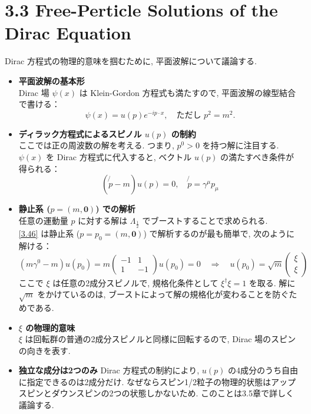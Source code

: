 \documentclass[a4paper,12pt]{article}
\begin{document}
\section*{3.3 Free-Perticle Solutions of the Dirac Equation}
 Dirac 方程式の物理的意味を掴むために, 平面波解について議論する.
\begin{itemize}
  \item \textbf{平面波解の基本形}\\
  Dirac 場 $\psi(x)$ は Klein-Gordon 方程式も満たすので, 平面波解の線型結合で書ける：
  \begin{equation*}
    \psi(x) = u(p) e^{-ip \cdot x}, \quad \text{ただし } p^2 = m^2. \tag{3.45}
  \end{equation*}
  \item \textbf{ディラック方程式によるスピノル $u(p)$ の制約}\\ 
  ここでは正の周波数の解を考える. つまり, $p^0 > 0$ を持つ解に注目する. $\psi(x)$ を Dirac 方程式に代入すると, ベクトル $u(p)$ の満たすべき条件が得られる：
  \begin{equation*}
    (\not{p} - m) u(p) = 0, \quad \not{p} = \gamma^\mu p_\mu \label{3.46}\tag{3.46}
  \end{equation*}

  \item \textbf{静止系 ($p = (m, \mathbf{0})$) での解析}\\
  任意の運動量 $p$ に対する解は $\Lambda_{\frac{1}{2}}$ でブーストすることで求められる.\\
  \eqref{3.46} は静止系 ($p = p_0 = (m, \mathbf{0}) $) で解析するのが最も簡単で, 次のように解ける：
  \begin{equation*}
    (m \gamma^0 - m) u(p_0) = m \begin{pmatrix}
      -1 & 1 \\
      1 & -1
    \end{pmatrix} u(p_0) = 0 \quad \Rightarrow \quad
    u(p_0) = \sqrt{m}
    \begin{pmatrix}
    \xi \\
    \xi
    \end{pmatrix} \tag{3.47}
  \end{equation*}
  ここで $\xi$ は任意の2成分スピノルで, 規格化条件として $\xi^\dagger \xi = 1$ を取る. 解に $\sqrt{m}$ をかけているのは, ブーストによって解の規格化が変わることを防ぐためである.
  \item \textbf{$\xi$ の物理的意味}\\
  $\xi$ は回転群の普通の2成分スピノルと同様に回転するので, Dirac 場のスピンの向きを表す.
  \item \textbf{独立な成分は2つのみ}  
  Dirac 方程式の制約により, $u(p)$ の4成分のうち自由に指定できるのは2成分だけ. なぜならスピン1/2粒子の物理的状態はアップスピンとダウンスピンの2つの状態しかないため. このことは3.5章で詳しく議論する.


\end{itemize}
\end{document}
